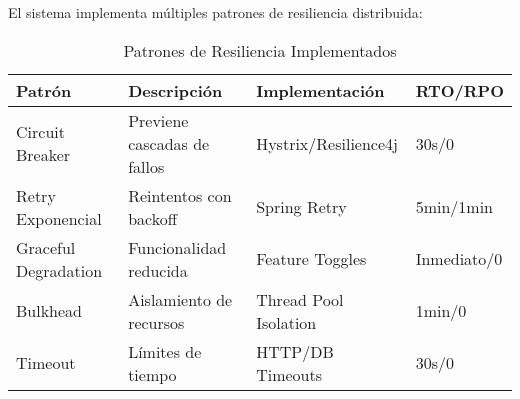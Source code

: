 El sistema implementa múltiples patrones de resiliencia distribuida:

\vspace{0.2cm}

\begin{table}[H]
\centering
\caption{Patrones de Resiliencia Implementados}
\label{tab:resilience_patterns}
\renewcommand{\arraystretch}{1.3}
\begin{tabular}{@{}l|p{3cm}|p{2.5cm}|p{1.5cm}@{}}
\toprule
\textbf{Patrón} & \textbf{Descripción} & \textbf{Implementación} & \textbf{RTO/RPO} \\
\midrule
Circuit Breaker & Previene cascadas de fallos & Hystrix/Resilience4j & 30s/0 \\
Retry Exponencial & Reintentos con backoff & Spring Retry & 5min/1min \\
Graceful Degradation & Funcionalidad reducida & Feature Toggles & Inmediato/0 \\
Bulkhead & Aislamiento de recursos & Thread Pool Isolation & 1min/0 \\
Timeout & Límites de tiempo & HTTP/DB Timeouts & 30s/0 \\
\bottomrule
\end{tabular}
\end{table}

\vspace{0.2cm}

